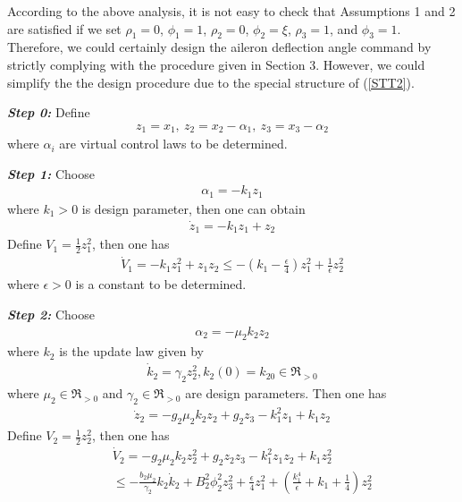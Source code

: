 \documentclass{tSYS2e}
\theoremstyle{plain}
\theoremstyle{definition}
\begin{document}
According to the above analysis, it is not easy to check that Assumptions 1 and 2 are satisfied
if we set $\rho _{1}=0$, $\phi_{1}=1$, $\rho _{2}=0$, $\phi_{2}=\xi$, $\rho_{3}=1$, and $\phi_{3}=1$.
Therefore, we could certainly design the aileron deflection angle command by strictly complying with the procedure given in Section 3.
However, we could simplify the the design procedure due to the special structure of (\ref{STT2}).

\textbf{\emph{Step 0:}} Define
\begin{eqnarray}
z_{1}=x_{1},~z_{2}=x_{2}-\alpha _{1},~z_{3}=x_{3}-\alpha _{2}
\end{eqnarray}
where $\alpha _{i}$ are virtual control laws to be determined.

\textbf{\emph{Step 1:}} Choose
\begin{eqnarray}
\alpha _{1}=-k_1z_1
\end{eqnarray}
where $k_1>0$ is design parameter, then one can obtain
\begin{eqnarray*}
\dot{z}_{1}=-k_1z_1+z_{2}
\end{eqnarray*}
Define $V_{1}=\frac{1}{2}z_1^2$, then one has
\begin{eqnarray*}
\dot{V}_{1}=-k_1z_1^2+z_1z_{2}\leq-\left(k_1-\frac{\epsilon}{4}\right)z_1^2+\frac{1}{\epsilon}z_{2}^2
\end{eqnarray*}
where $\epsilon>0$ is a constant to be determined.

\textbf{\emph{Step 2:}} Choose
\begin{eqnarray}
\alpha_{2}=-\mu _{2}k_{2}z_{2}
\end{eqnarray}
where $k_{2}$ is the update law given by
\begin{eqnarray}
\dot{k}_{2} =\gamma _{2}z_{2}^{2}, k_{2}(0)=k_{20}\in \Re _{>0}
\end{eqnarray}
where $\mu _{2}\in \Re _{>0}$ and $\gamma _{2}\in \Re _{>0}$ are design parameters. Then one has
\begin{eqnarray*}
\dot{z}_{2}=-g_{2}\mu _{2}k_{2}z_{2}+g_{2}z_3-k_1^2z_1+k_1z_{2}
\end{eqnarray*}
Define $V_{2}=\frac{1}{2}z_2^2$, then one has
\begin{eqnarray*}
&&\dot{V}_{2}=-g_{2}\mu _{2}k_{2}z_{2}^2+g_{2}z_2z_3-k_1^2z_1z_2+k_1z_{2}^2\nonumber\\
&&\leq-\frac{b_{2}\mu _{2}}{\gamma _{2}}k_{2}\dot{k}_{2}+B_{2}^2\phi _{2}^2z_3^2+\frac{\epsilon}{4}z_1^2+\left(\frac{k_1^4}{\epsilon}+k_1+\frac{1}{4}\right)z_{2}^2
\end{eqnarray*}
\end{document}
